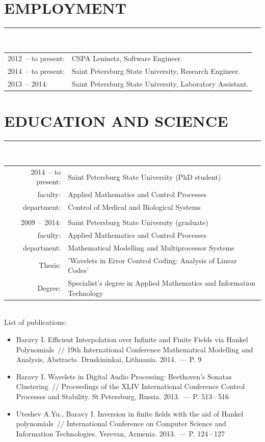 \documentclass[a4paper,oneside,12pt]{article}
\newcommand{\cvpart}[1]{%
\vspace{-0.9em}%
\section*{\Large\bfseries\MakeTextUppercase{#1}}%
\vspace{-1.7em}%
\rule{\linewidth}{0.3em}\\[-0.8em]%
}
\begin{document}
\cvpart{Employment}

\begin{tabularx}{\linewidth}{lX}
2012~-- to present:& CSPA Leninetz, Software Engineer.\\
2014~-- to present:& Saint Petersburg State University, Research Engineer.\\
2013~-- 2014:& Saint Petersburg State University, Laboratory Assistant.
\end{tabularx}


\cvpart{Education and Science}

\begin{tabularx}{\linewidth}{rX}
2014~-- to present:& Saint Petersburg State University (PhD student)\\
           faculty:& Applied Mathematics and Control Processes\\
        department:& Control of Medical and Biological Systems\\
                   & \\
      2009~-- 2014:& Saint Petersburg State University (graduate)\\
           faculty:& Applied Mathematics and Control Processes\\
        department:& Mathematical Modelling and Multiprocessor Systems\\
            Thesis:& 'Wavelets in Error Control Coding: Analysis of Linear Codes'\\
            Degree:& Specialist's degree in Applied Mathematics and Information Technology
\end{tabularx}

~\\

List of publications:
\begin{itemize}

\item Baravy I. Efficient Interpolation over Infinite and Finite Fields via Hankel Polynomials~// 19th International
Conference Mathematical Modelling and Analysis, Abstracts. Druskininkai, Lithuania. 2014.~--- P. 9

\item Baravy I. Wavelets in Digital Audio Processing: Beethoven's Sonatas Clustering~// Proceedings of the XLIV International Conference
Control Processes and Stability. St.Petersburg, Russia. 2013.~--- P. 513\,--\,516

\item Uteshev A.Yu., Baravy I. Inversion in finite fields with the aid of Hankel polynomials~// International Conference
on Computer Science and Information Technologies. Yerevan, Armenia. 2013.~--- P. 124\,--\,127
\end{itemize}
\end{document}
